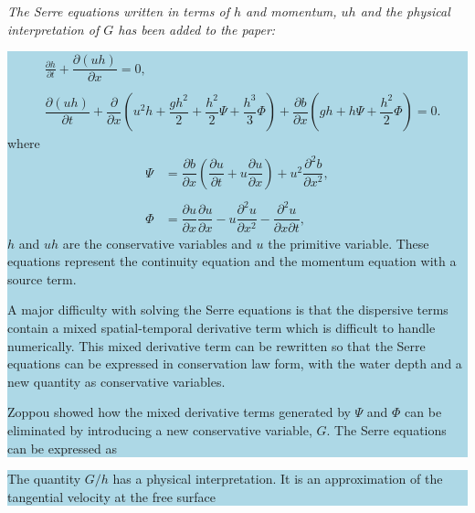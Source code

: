 \documentclass[subeqn]{article}
\newcommand{\hlb}[1] {\par\colorbox{lightblue}{\parbox{\linewidth}{#1}}}
\begin{document}
\emph{The Serre equations written in terms of $h$ and momentum, $uh$  and the physical interpretation of $G$ has been added to the paper:}
\hlb{
\begin{subequations}
	\begin{align*}
	&\frac{\partial h}{\partial t} + \dfrac{\partial (uh)}{\partial x} = 0,  \label{eqn:FullSerreNonConMass} \\ \nonumber \\
	&\dfrac{\partial (uh)}{\partial t} + \dfrac{\partial}{\partial x} \left ( u^2h + \dfrac{gh^2}{2} + \dfrac{h^2}{2}{\Psi} + \dfrac{h^3}{3}{ \Phi }  \right )  +  \dfrac{\partial b}{\partial x} \left (gh +   h \Psi + \dfrac{h^2}{2}{ \Phi }  \right ) = 0.	%
	\end{align*}
\end{subequations}
where
\begin{subequations}
	\begin{align*}
	{ \Psi }  &= \dfrac{\partial b}{\partial x}\left(\dfrac{\partial u}{\partial t} + u\dfrac{\partial u}{\partial x} \right)  + u^2\dfrac{\partial^2 b}{\partial x^2}, %
	\\ \nonumber \\
	{ \Phi }  &= \dfrac{\partial u }{\partial x} \dfrac{\partial u}{\partial x} -u \dfrac{\partial^2 u}{\partial x^2}  - \dfrac{\partial^2 u}{\partial x \partial t},  %
	\end{align*}
\end{subequations}
$h$ and $uh$  are the conservative variables and $u$ the primitive variable. These equations represent the continuity equation and the momentum equation with a source term.

A major difficulty with solving the Serre equations is that the dispersive terms contain a mixed spatial-temporal derivative term which is difficult to handle numerically. This mixed derivative term can be rewritten  so that the Serre equations can be expressed in conservation law form, with the water depth and a new quantity as conservative variables.

Zoppou \cite{Zoppou-2017-70} showed how the mixed derivative terms generated by $\Psi$ and $\Phi$ can be eliminated by introducing a new conservative variable, $G$. The Serre equations can be expressed as}

\hlb{The quantity $G/h$ has a physical interpretation. It is an approximation of the tangential velocity at the free surface\cite{Clamond-Dutykh-2018-237}}
\end{document}

